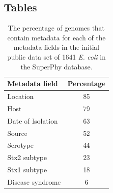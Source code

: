 \documentclass[doublespacing, linenumbers]{bmcart}
\begin{document}
\begin{backmatter}
\section*{Tables}
\begin{table}[h!]
\caption{The percentage of genomes that contain metadata for each of the metadata fields in the initial public data set of 1641 \textit{E. coli} in the SuperPhy database.}
\label{tab:metadata}
      \begin{tabular}{lc}
        \hline
        Metadata field & Percentage\\ 
        \hline
        Location & 85\\
        Host & 79\\
        Date of Isolation & 63\\
        Source & 52\\
        Serotype & 44\\
        Stx2 subtype & 23\\
        Stx1 subtype & 18\\
        Disease syndrome & 6\\ 
        \hline
      \end{tabular}
\end{table}


\end{backmatter}
\end{document}
